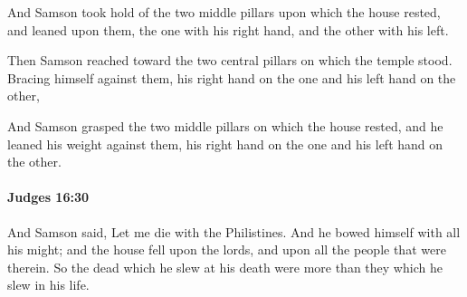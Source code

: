 			\begin{versebox}
					\item[BHS] 
					\item[ASV] And Samson took hold of the two middle pillars upon which the house rested, and leaned upon them, the one with his right hand, and the other with his left.
					\item[NIV] Then Samson reached toward the two central pillars on which the temple stood. Bracing himself against them, his right hand on the one and his left hand on the other,
					\item[NRSV] And Samson grasped the two middle pillars on which the house rested, and he leaned his weight against them, his right hand on the one and his left hand on the other.
			\end{versebox}

		\paragraph{Judges 16:30} %
			\label{JUDGES-16-30}

			And Samson said, Let me die with the Philistines. And he bowed himself with all his might; and the house fell upon the lords, and upon all the people that were therein. So the dead which he slew at his death were more than they which he slew in his life.

